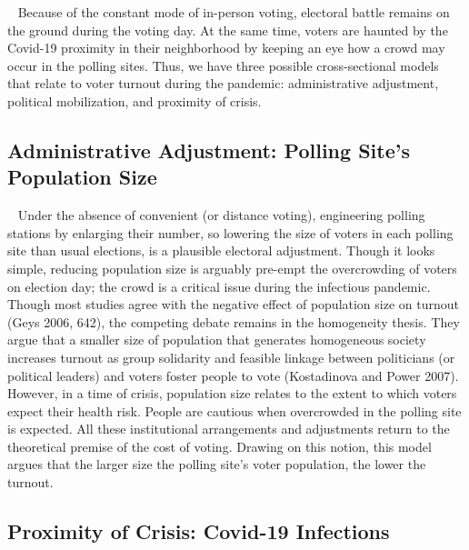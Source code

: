 \documentclass[
  12pt,
]{article}
\begin{document}
~ Because of the constant mode of in-person voting, electoral battle
remains on the ground during the voting day. At the same time, voters
are haunted by the Covid-19 proximity in their neighborhood by keeping
an eye how a crowd may occur in the polling sites. Thus, we have three
possible cross-sectional models that relate to voter turnout during the
pandemic: administrative adjustment, political mobilization, and
proximity of crisis.

\hypertarget{administrative-adjustment-polling-sites-population-size}{%
\subsection{Administrative Adjustment: Polling Site's Population
Size}\label{administrative-adjustment-polling-sites-population-size}}

~ Under the absence of convenient (or distance voting), engineering
polling stations by enlarging their number, so lowering the size of
voters in each polling site than usual elections, is a plausible
electoral adjustment. Though it looks simple, reducing population size
is arguably pre-empt the overcrowding of voters on election day; the
crowd is a critical issue during the infectious pandemic. Though most
studies agree with the negative effect of population size on turnout
(Geys 2006, 642), the competing debate remains in the homogeneity
thesis. They argue that a smaller size of population that generates
homogeneous society increases turnout as group solidarity and feasible
linkage between politicians (or political leaders) and voters foster
people to vote (Kostadinova and Power 2007). However, in a time of
crisis, population size relates to the extent to which voters expect
their health risk. People are cautious when overcrowded in the polling
site is expected. All these institutional arrangements and adjustments
return to the theoretical premise of the cost of voting. Drawing on this
notion, this model argues that the larger size the polling site's voter
population, the lower the turnout.

\hypertarget{proximity-of-crisis-covid-19-infections}{%
\subsection{Proximity of Crisis: Covid-19
Infections}\label{proximity-of-crisis-covid-19-infections}}
\end{document}
